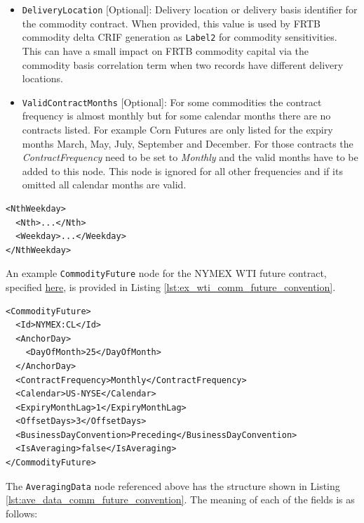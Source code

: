 \begin{itemize}
\item \lstinline!DeliveryLocation! [Optional]: Delivery location or delivery basis identifier for the commodity contract. When provided, this value is used by FRTB commodity delta CRIF generation as \lstinline!Label2! for commodity sensitivities. This can have a small impact on FRTB commodity capital via the commodity basis correlation term when two records have different delivery locations.
\item \lstinline!ValidContractMonths! [Optional]: For some commodities the contract frequency is almost monthly but for some calendar months there are no contracts listed. For example Corn Futures are only listed for the expiry months March, May, July, September and December. For those contracts the \emph{ContractFrequency} need to be set to \emph{Monthly} and the valid months have to be added to this node. This node is ignored for all other frequencies and if its omitted all calendar months are valid.
\end{itemize}

\begin{listing}[h!]
\begin{verbatim}
<NthWeekday>
  <Nth>...</Nth>
  <Weekday>...</Weekday>
</NthWeekday>
\end{verbatim}
\caption{\textnormal{\lstinline!NthWeekday!} node outline}
\label{lst:nth_weekday_node}
\end{listing}

An example \lstinline!CommodityFuture! node for the NYMEX WTI future contract, specified \href{https://www.cmegroup.com/trading/energy/crude-oil/light-sweet-crude_contract_specifications.html}{here}, is provided in Listing \ref{lst:ex_wti_comm_future_convention}.

\begin{listing}[h!]
\begin{verbatim}
<CommodityFuture>
  <Id>NYMEX:CL</Id>
  <AnchorDay>
    <DayOfMonth>25</DayOfMonth>
  </AnchorDay>
  <ContractFrequency>Monthly</ContractFrequency>
  <Calendar>US-NYSE</Calendar>
  <ExpiryMonthLag>1</ExpiryMonthLag>
  <OffsetDays>3</OffsetDays>
  <BusinessDayConvention>Preceding</BusinessDayConvention>
  <IsAveraging>false</IsAveraging>
</CommodityFuture>
\end{verbatim}
\caption{NYMEX WTI \textnormal{\lstinline!CommodityFuture!} node}
\label{lst:ex_wti_comm_future_convention}
\end{listing}

The \lstinline!AveragingData! node referenced above has the structure shown in Listing \ref{lst:ave_data_comm_future_convention}. The meaning of each of the fields is as follows:

